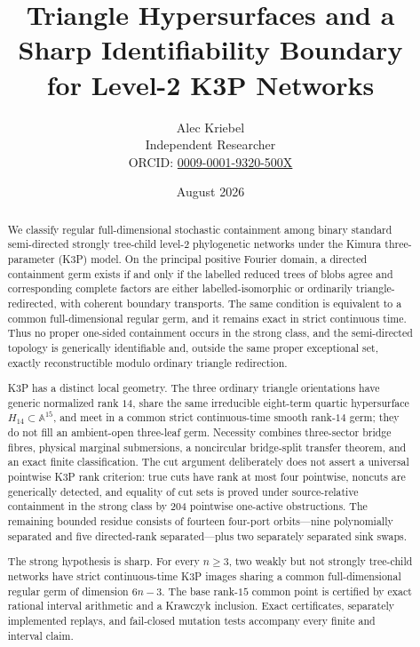 \documentclass[11pt]{article}
\title{Triangle Hypersurfaces and a Sharp Identifiability Boundary\\
for Level-2 K3P Networks}
\author{Alec Kriebel\\
\small Independent Researcher\\
\small ORCID: \href{https://orcid.org/0009-0001-9320-500X}
{0009-0001-9320-500X}}
\date{August 2026}
\theoremstyle{remark}
\newcommand{\1}{\mathbf 1}
\begin{document}
\maketitle

\begin{abstract}
We classify regular full-dimensional stochastic containment among binary
standard semi-directed strongly tree-child level-2 phylogenetic networks
under the Kimura three-parameter (K3P) model.  On the principal positive
Fourier domain, a directed containment germ exists if and only if the labelled
reduced trees of blobs agree and corresponding complete factors are either
labelled-isomorphic or ordinarily triangle-redirected, with coherent boundary
transports.  The same condition is equivalent to a common
full-dimensional regular germ, and it remains exact in strict continuous
time.  Thus no proper one-sided containment occurs in the strong class, and
the semi-directed topology is generically identifiable and, outside the
same proper exceptional set, exactly reconstructible modulo ordinary
triangle redirection.

K3P has a distinct local geometry.  The three ordinary triangle orientations
have generic normalized rank \(14\), share the same irreducible eight-term
quartic hypersurface \(H_{14}\subset\mathbb A^{15}\), and meet in a common
strict continuous-time smooth rank-\(14\) germ; they do not fill an
ambient-open three-leaf germ.  Necessity combines three-sector bridge fibres,
physical marginal submersions, a noncircular bridge-split transfer theorem,
and an exact finite classification.  The cut argument deliberately does not
assert a universal pointwise K3P rank criterion: true cuts have rank at most
four pointwise, noncuts are generically detected, and equality of cut sets is
proved under source-relative containment in the strong class by 204
pointwise one-active obstructions.  The remaining bounded residue consists
of fourteen four-port orbits---nine polynomially separated and five
directed-rank separated---plus two separately separated sink swaps.

The strong hypothesis is sharp.  For every \(n\ge3\), two weakly but not
strongly tree-child networks have strict continuous-time K3P images sharing
a common full-dimensional regular germ of dimension \(6n-3\).  The base
rank-\(15\) common point is certified by exact rational interval arithmetic
and a Krawczyk inclusion.  Exact certificates, separately implemented
replays, and fail-closed mutation tests accompany every finite and interval
claim.
\end{abstract}
\end{document}
